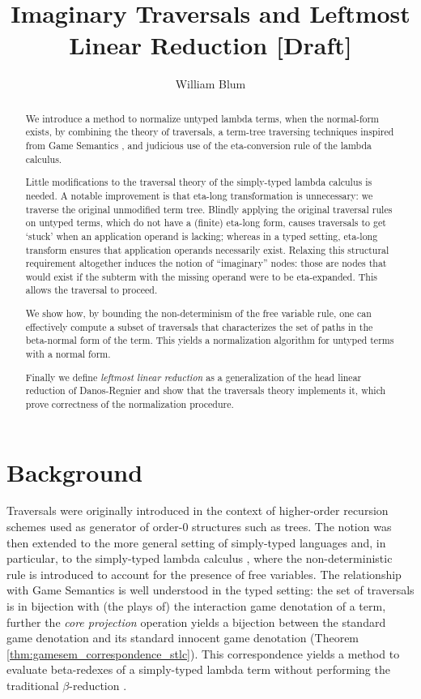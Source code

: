 \documentclass{article}
\author{William Blum}
\title{Imaginary Traversals and Leftmost Linear Reduction [Draft]}
\theoremstyle{definition}
\begin{document}
\maketitle
\begin{abstract}
We introduce a method to normalize untyped lambda terms, when the normal-form exists, by combining the theory of traversals, a term-tree traversing techniques inspired from Game Semantics \cite{Ong2006,BlumPhd}, and judicious use of the eta-conversion rule of the lambda calculus.

Little modifications to the traversal theory of the simply-typed lambda calculus \cite{BlumPhd} is needed. A notable improvement is that eta-long transformation is unnecessary: we traverse the original unmodified term tree. Blindly applying the original traversal rules on untyped terms, which do not have a (finite) eta-long form, causes traversals to get `stuck' when an application operand is lacking; whereas in a typed setting, eta-long transform ensures that application operands necessarily exist. Relaxing this structural requirement altogether induces the notion of ``imaginary'' nodes: those are nodes that would exist
 if the subterm with the missing operand were to be eta-expanded. This allows the traversal to proceed.

We show how, by bounding the non-determinism of the free variable rule, one can effectively compute a subset of traversals that characterizes the set of paths in the beta-normal form of the term. This yields a normalization algorithm for untyped terms with a normal form.

Finally we define \emph{leftmost linear reduction} as a generalization of the head linear reduction of Danos-Regnier and show that the traversals theory implements it, which prove correctness of the normalization procedure.
\end{abstract}

\section{Background}

Traversals were originally introduced in the context of higher-order recursion schemes \cite{Ong2006} used as generator of order-$0$ structures such as trees.
The notion was then extended to the more general setting of simply-typed languages and, in particular, to the simply-typed lambda calculus \cite{BlumPhd}, where the non-deterministic rule  is introduced to account for the presence of free variables. The relationship with Game Semantics is well understood in the typed setting: the set of traversals is in bijection with (the plays of) the interaction game denotation of a term, further the \emph{core projection} operation yields a bijection between the standard game denotation and its standard innocent game denotation (Theorem \ref{thm:gamesem_correspondence_stlc}). This correspondence yields a method to evaluate beta-redexes of a simply-typed lambda term without performing the traditional $\beta$-reduction \cite{danos-head,BlumPhd,BlumGalop2008, Blum-LocalBeta2008}.
\end{document}
